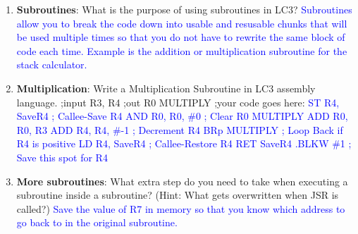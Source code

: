 \documentclass{article}
\begin{document}
\begin{enumerate}[label=(\alph*)]
    \item \textbf{Subroutines}: What is the purpose of using subroutines in LC3?
    \newline\textcolor{blue}{ Subroutines allow you to break the code down into usable and resusable chunks that will be used multiple times so that you do not have to rewrite the same block of code each time. Example is the addition or multiplication subroutine for the stack calculator.
    }
    \item \textbf{Multiplication}: Write a Multiplication Subroutine in LC3 assembly language.
    \newline
    ;input R3, R4 \newline
    ;out R0 \newline
    MULTIPLY \newline
    ;your code goes here: \newline
    \newline\textcolor{blue}{
    ST R4, SaveR4    \hfill ; Callee-Save R4 \newline
    AND R0, R0, \#0   \hfill ; Clear R0 \newline
    MULTIPLY \newline
    ADD R0, R0, R3 \hfill \newline
    ADD R4, R4, \#-1 \hfill ; Decrement R4 \newline
    BRp MULTIPLY \hfill ; Loop Back if R4 is positive \newline
    \newline
    LD R4, SaveR4 \hfill ; Callee-Restore R4
    \newline
    RET
    \newline
    SaveR4 .BLKW \#1 \hfill ; Save this spot for R4}

    \item 
    \textbf{More subroutines}: What extra step do you need to take when executing a subroutine inside a subroutine? (Hint: What gets overwritten when JSR is called?)\newline
    \textcolor{blue}{ Save the value of R7 in memory so that you know which address to go back to in the original subroutine.}
    \end{enumerate}
    
\newpage
\end{document}
